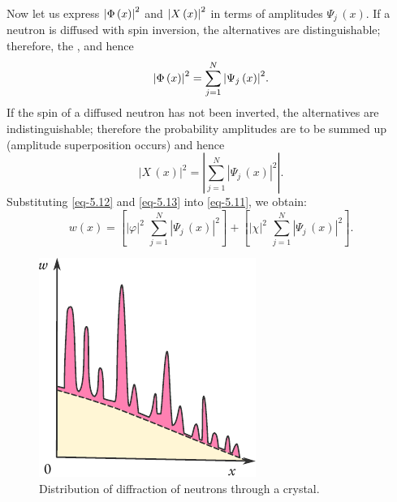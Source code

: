 Now let us express $ \abs{\Phi \, (x) }^{2}$ and $ \abs{X \, (x) }^{2}$ in terms of amplitudes  $\Psi_{j} \, (x)$. If a neutron is diffused with spin inversion, the alternatives are distinguishable; therefore, the , and hence
\begin{equation}%
\abs{\Phi \, (x) }^{2} = \sum_{j=1}^{N} \abs{\Psi_{j} \, (x) }^{2}.
\label{eq-5.12}
\end{equation}
If the spin of a diffused neutron has not been inverted, the alternatives
are indistinguishable; therefore the probability amplitudes are to be
summed up (amplitude superposition occurs) and hence
\begin{equation}%
|X \, (x) |^{2} = \left| \sum_{j=1}^{N} |\Psi_{j} \, (x) |^{2} \right|.
\label{eq-5.13}
\end{equation}
Substituting \eqref{eq-5.12} and \eqref{eq-5.13} into \eqref{eq-5.11}, we obtain:
\begin{equation}%
w(x) = \left[  |\varphi |^{2} \,\,  \sum_{j=1}^{N} |\Psi_{j} \, (x) |^{2} \right] + \left[  |\chi |^{2} \,\,  \sum_{j=1}^{N} |\Psi_{j} \, (x) |^{2} \right] . 
\label{eq-5.14}
\end{equation}

\begin{figure}
\centering
\includegraphics[width=\linewidth]{figures/neutron-dist.pdf}
\caption{Distribution of diffraction of neutrons through a crystal.
\label{neutron-dist}}
\end{figure}


